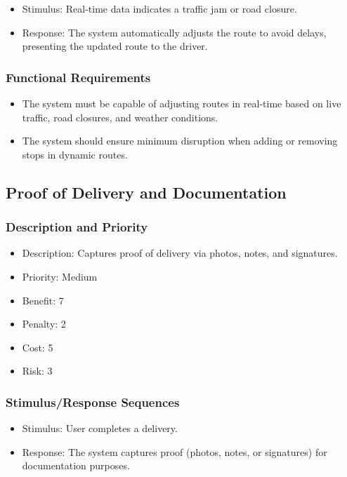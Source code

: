 \begin{itemize}
    \item Stimulus: Real-time data indicates a traffic jam or road closure.
    \item Response: The system automatically adjusts the route to avoid delays, presenting the updated route to the driver.
\end{itemize}

\subsubsection{Functional Requirements}

\begin{itemize}
    \item The system must be capable of adjusting routes in real-time based on live traffic, road closures, and weather conditions.
    \item The system should ensure minimum disruption when adding or removing stops in dynamic routes.
\end{itemize}

\subsection{Proof of Delivery and Documentation}
\subsubsection{Description and Priority}

\begin{itemize}
    \item Description: Captures proof of delivery via photos, notes, and signatures.
    \item Priority: Medium
    \item Benefit: 7
    \item Penalty: 2
    \item Cost: 5
    \item Risk: 3
\end{itemize}

\subsubsection{Stimulus/Response Sequences}

\begin{itemize}
    \item Stimulus: User completes a delivery.
    \item Response: The system captures proof (photos, notes, or signatures) for documentation purposes.
\end{itemize}

